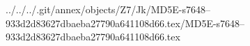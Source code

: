 ../../../.git/annex/objects/Z7/Jk/MD5E-s7648--933d2d83627dbaeba27790a641108d66.tex/MD5E-s7648--933d2d83627dbaeba27790a641108d66.tex